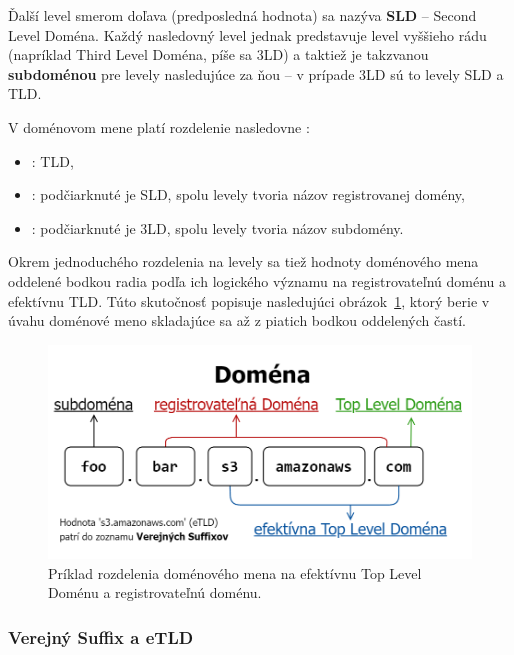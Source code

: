\pagebreak

Ďalší level smerom doľava (predposledná hodnota) sa nazýva \textbf{SLD} -- Second Level Doména.
Každý nasledovný level jednak predstavuje level vyššieho rádu (napríklad Third Level Doména, píše sa 3LD) a taktiež je takzvanou \textbf{subdoménou} pre levely nasledujúce za ňou -- v prípade 3LD sú to levely SLD a TLD.

V doménovom mene  platí rozdelenie nasledovne \cite{michal-spacek-etld-article}: 
\begin{itemize}    
    \item {}: TLD,
    \item {}: podčiarknuté je SLD, spolu levely tvoria názov registrovanej domény,
    \item {}: podčiarknuté je 3LD, spolu levely tvoria názov subdomény.
\end{itemize}

Okrem jednoduchého rozdelenia na levely sa tiež hodnoty doménového mena oddelené bodkou radia podľa ich logického významu na registrovateľnú doménu a efektívnu TLD.
Túto skutočnosť popisuje nasledujúci \mbox{obrázok \ref{fig:domain-name-structure}}, \mbox{ktorý} berie v úvahu doménové meno skladajúce sa až z piatich bodkou oddelených častí.

\begin{figure}[htb]
\begin{center}
 \includegraphics[scale=0.45]{obrazky-figures/domain_name_structure.png}
 \caption{Príklad rozdelenia doménového mena na efektívnu Top Level Doménu a registrovateľnú doménu.}
 \label{fig:domain-name-structure}
\end{center}
\end{figure}


\subsubsection{Verejný Suffix a eTLD}
\label{public-suffix-and-etld}

